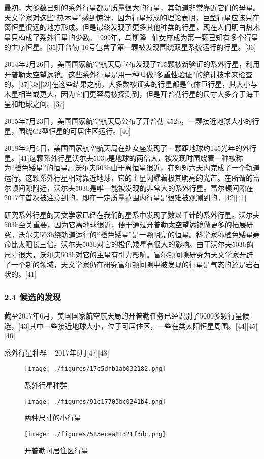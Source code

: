 最初，大多数已知的系外行星都是质量很大的行星，其轨道非常靠近它们的母星。天文学家对这些“热木星”感到惊讶，因为行星形成的理论表明，巨型行星应该只在离恒星很远的地方形成。但是最终发现了更多其他种类的行星，现在人们明白热木星只构成了系外行星的少数。1999年，乌斯隆·仙女座成为第一颗已知有多个行星的主序恒星。[35]开普勒-16号包含了第一颗被发现围绕双星系统运行的行星。[36]

2014年2月26日，美国国家航空航天局宣布发现了715颗被新验证的系外行星，利用开普勒太空望远镜。这些系外行星是用一种叫做“多重性验证”的统计技术来检查的。[37][38][39]在这些结果之前，大多数被证实的行星都是气体巨行星，其大小与木星相当或更大，因为它们更容易被探测到，但是开普勒行星的尺寸大多介于海王星和地球之间。[37]

2015年7月23日，美国国家航空航天局公布了开普勒-452b，一颗接近地球大小的行星，围绕G2型恒星的可居住区运行。[40]

2018年9月6日，美国国家航空航天局在处女座发现了一颗距地球约145光年的外行星。[41]这颗系外行星沃尔夫503b是地球的两倍大，被发现时围绕着一种被称为“橙色矮星”的恒星。沃尔夫503b由于离恒星很近，在短短六天内完成了一个轨道运行。这颗系外行星相对靠近地球，它的主星闪耀着极其明亮的光芒。在所谓的富尔顿间隙附近，沃尔夫503b是唯一能被发现的非常大的系外行星。富尔顿间隙在2017年首次被注意到的，即在一定质量范围内行星是很难被观测到的。[42][41]

研究系外行星的天文学家已经在我们的星系中发现了数以千计的系外行星。沃尔夫503b至关重要，因为它离地球很近，便于通过开普勒太空望远镜做更多的拓展研究。沃尔夫503b绕轨道运行的“橙色矮星”是一颗明亮的恒星。科学家称橙色矮星寿命比太阳长三倍。沃尔夫503b对它的橙色矮星有很大的影响。由于沃尔夫503b的尺寸很大，沃尔夫503b对它的主星有引力影响。富尔顿间隙研究为天文学家开辟了一个新的领域，天文学家仍在研究富尔顿间隙中被发现的行星是气态的还是岩石状的。[41]
\subsubsection{2.4 候选的发现}
截至2017年6月，美国国家航空航天局的开普勒任务已经识别了5000多颗行星候选，[43]其中一些接近地球大小，位于可居住区，一些在类太阳恒星周围。[44][45][46]

系外行星种群 – 2017年6月[47][48]
\begin{figure}[ht]
\centering
\texttt{[image: ./figures/17c5dfb1ab032182.png]}
\caption{系外行星种群} \label{fig_TYXWXX_5}
\end{figure}
\begin{figure}[ht]
\centering
\texttt{[image: ./figures/91c17703bc0241b4.png]}
\caption{两种尺寸的小行星} \label{fig_TYXWXX_6}
\end{figure}
\begin{figure}[ht]
\centering
\texttt{[image: ./figures/583ecea81321f3dc.png]}
\caption{开普勒可居住区行星} \label{fig_TYXWXX_7}
\end{figure}

